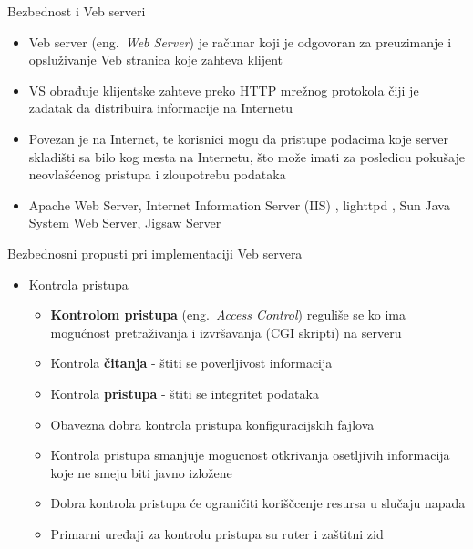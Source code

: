 \documentclass{beamer}
\begin{document}
\begin{frame}{Bezbednost i Veb serveri}
    \begin{itemize}
        \item {
        Veb server (eng.~{\em Web Server}) je računar koji je odgovoran za preuzimanje i opsluživanje Veb stranica koje zahteva klijent
        } \pause
        \item{ VS obrađuje klijentske zahteve preko HTTP mrežnog protokola čiji je zadatak da distribuira informacije na Internetu}  \pause
        \item { Povezan je na Internet, te korisnici mogu da pristupe podacima koje server skladišti sa bilo kog mesta na Internetu, što može imati za posledicu pokušaje neovlašćenog pristupa i zloupotrebu podataka } \pause
         \item {Apache Web Server, Internet Information Server (IIS) , lighttpd , Sun Java System Web Server, Jigsaw Server }
    \end{itemize}
\end{frame}

\begin{frame}{Bezbednosni propusti pri implementaciji Veb servera }
    \begin{itemize}
        \item {Kontrola pristupa 
        \begin{itemize}
            \item  {\textbf{Kontrolom pristupa} (eng.~{\em Access Control}) reguliše se ko ima mogućnost pretraživanja i izvršavanja (CGI skripti) na serveru } \pause
        \item  { 
         Kontrola \textbf{čitanja} - štiti se poverljivost informacija } \pause
         \item{Kontrola \textbf{pristupa} - štiti se  integritet podataka } \pause
         \item{Obavezna dobra kontrola pristupa konfiguracijskih fajlova}  \pause
         \item{Kontrola pristupa smanjuje mogucnost otkrivanja osetljivih informacija koje ne smeju biti javno izložene}  \pause
         \item{ Dobra kontrola pristupa  će ograničiti koriščcenje resursa u slučaju napada } \pause
         \item{Primarni uređaji za kontrolu pristupa su ruter i zaštitni zid
        }
        \end{itemize}
        }
    \end{itemize}
\end{frame}
\end{document}
